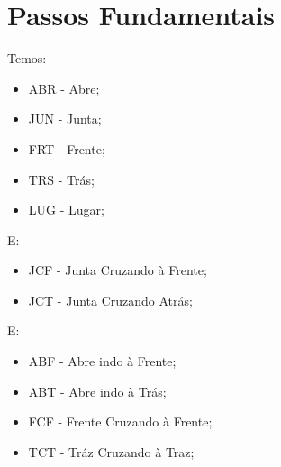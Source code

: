 \chapter{Passos Fundamentais}

Temos:

\begin{itemize}
	\item ABR - Abre;
	\item JUN - Junta;
	\item FRT - Frente;
	\item TRS - Trás;
	\item LUG - Lugar;
\end{itemize}

E:

\begin{itemize}
	\item JCF - Junta Cruzando à Frente;
	\item JCT - Junta Cruzando Atrás;
\end{itemize}

E:

\begin{itemize}
	\item ABF - Abre indo à Frente;
	\item ABT - Abre indo à Trás;
	\item FCF - Frente Cruzando à Frente;
	\item TCT - Tráz Cruzando à Traz;
\end{itemize}


